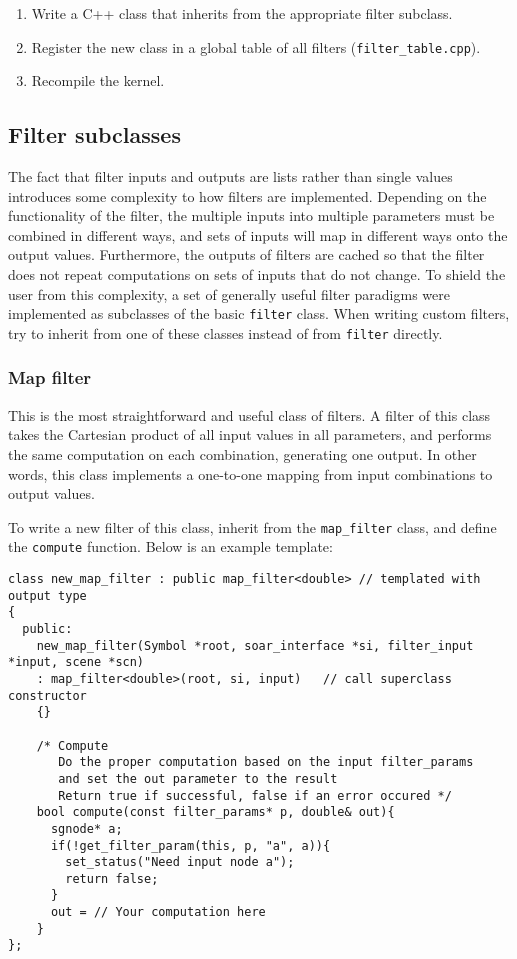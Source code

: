 \begin{enumerate}
\item Write a C++ class that inherits from the appropriate filter subclass.
\item Register the new class in a global table of all filters (\texttt{filter\_table.cpp}).
\item Recompile the kernel. 
\end{enumerate}

\subsection{Filter subclasses}

The fact that filter inputs and outputs are lists rather than single values introduces some complexity to how filters are implemented.
Depending on the functionality of the filter, the multiple inputs into multiple parameters must be combined in different ways, and sets of inputs will map in different ways onto the output values.
Furthermore, the outputs of filters are cached so that the filter does not repeat computations on sets of inputs that do not change.
To shield the user from this complexity, a set of generally useful filter paradigms were implemented as subclasses of the basic \texttt{filter} class.
When writing custom filters, try to inherit from one of these classes instead of from \texttt{filter} directly.

\subsubsection{Map filter}
This is the most straightforward and useful class of filters.
A filter of this class takes the Cartesian product of all input values in all parameters,
and performs the same computation on each combination, generating one output.
In other words, this class implements a one-to-one mapping from input combinations to output values.

To write a new filter of this class, inherit from the \texttt{map\_filter} class, 
and define the \texttt{compute} function. Below is an example template:

{\footnotesize
\begin{verbatim}
class new_map_filter : public map_filter<double> // templated with output type
{
  public:
    new_map_filter(Symbol *root, soar_interface *si, filter_input *input, scene *scn)
    : map_filter<double>(root, si, input)   // call superclass constructor
    {}

    /* Compute
       Do the proper computation based on the input filter_params 
       and set the out parameter to the result 
       Return true if successful, false if an error occured */
    bool compute(const filter_params* p, double& out){
      sgnode* a;
      if(!get_filter_param(this, p, "a", a)){
        set_status("Need input node a");
        return false;
      }
      out = // Your computation here
    }
};
\end{verbatim}
}


